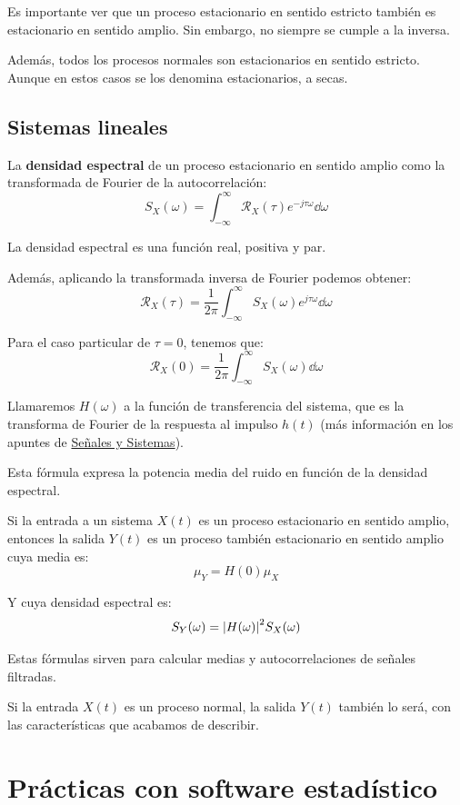 \documentclass[a4paper]{book}
\begin{document}
Es importante ver que un proceso estacionario en sentido estricto también es estacionario en sentido amplio. Sin embargo, no siempre se cumple a la inversa.

Además, todos los procesos normales son estacionarios en sentido estricto. Aunque en estos casos se los denomina estacionarios, a secas.

\section{Sistemas lineales}

La \textbf{densidad espectral} de un proceso estacionario en sentido amplio como la transformada de Fourier de la autocorrelación:
\[ S_X(\omega ) = \int_{-\infty}^{\infty} \mathcal{R}_X (\tau )e^{-j\tau \omega }\dd{\omega} \]

La densidad espectral es una función real, positiva y par.

Además, aplicando la transformada inversa de Fourier podemos obtener:
\[ \mathcal{R}_X(\tau )=\frac{1}{2\pi}\int_{-\infty}^{\infty}S_X(\omega )e^{j\tau \omega} \dd{\omega}\]

Para el caso particular de $\tau = 0$, tenemos que:
\[ \mathcal{R}_X(0)=\frac{1}{2\pi}\int_{-\infty}^{\infty}S_X(\omega )\dd{\omega}\]

Llamaremos $H(\omega )$ a la función de transferencia del sistema, que es la transforma de Fourier de la respuesta al impulso $h(t)$ (más información en los apuntes de \href{https://github.com/Javiolonchelo/ApuntesTeleco_2/blob/main/Primer%20Semestre/Señales%20y%20Sistemas/Señales%20y%20Sistemas.pdf}{Señales y Sistemas}).

Esta fórmula expresa la potencia media del ruido en función de la densidad espectral.

Si la entrada a un sistema $X(t)$ es un proceso estacionario en sentido amplio, entonces la salida $Y(t)$ es un proceso también estacionario en sentido amplio cuya media es:
\[ \mu _Y = H(0)\mu _X \]

Y cuya densidad espectral es:
\[ S_Y(\omega )= \abs{H(\omega )}^2 S_X(\omega )  \]

Estas fórmulas sirven para calcular medias y autocorrelaciones de señales filtradas.

Si la entrada $X(t)$ es un proceso normal, la salida $Y(t)$ también lo será, con las características que acabamos de describir.

\chapter{Prácticas con software estadístico}
\end{document}

